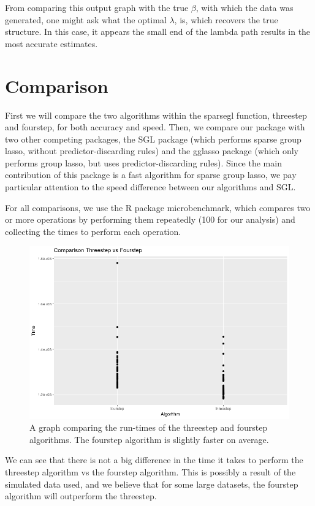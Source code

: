 \documentclass[12pt]{article}
\begin{document}
From comparing this output graph with the true $\beta$, with which the data was generated, one might ask what the optimal $\lambda$, is, which recovers the true structure. In this case, it appears the small end of the lambda path results in the most accurate estimates.


\section{Comparison}

First we will compare the two algorithms within the sparsegl function, threestep and fourstep, for both accuracy and speed. Then, we compare our package with two other competing packages, the SGL package (which performs sparse group lasso, without predictor-discarding rules) and the gglasso package (which only performs group lasso, but uses predictor-discarding rules). Since the main contribution of this package is a fast algorithm for sparse group lasso, we pay particular attention to the speed difference between our algorithms and SGL.

For all comparisons, we use the R package microbenchmark, which compares two or more operations by performing them repeatedly (100 for our analysis) and collecting the times to perform each operation.

\begin{figure}[tb!]
\centering
\includegraphics[scale=0.5]{threevsfour.png}
\caption{A graph comparing the run-times of the threestep and fourstep algorithms. The fourstep algorithm is slightly faster on average.}
\label{fig:threevsfour}
\end{figure}


We can see that there is not a big difference in the time it takes to perform the threestep algorithm vs the fourstep algorithm. This is possibly a result of the simulated data used, and we believe that for some large datasets, the fourstep algorithm will outperform the threestep.
\end{document}

